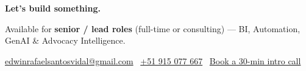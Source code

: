 \documentclass[10pt,letterpaper]{article}
\begin{document}
\noindent\colorbox{chip}{%
  \begin{minipage}{\dimexpr\linewidth-2\fboxsep\relax}
    \vspace{6pt}
    \begin{center}
      {\bfseries\color{ink}Let's build something.}\par
      \vspace{4pt}
      {\small\color{inkdim}Available for \textbf{\color{ink}senior / lead roles} (full-time or consulting) --- BI, Automation, GenAI \& Advocacy Intelligence.}\par
      \vspace{3pt}
      {\small\color{inkdim}\href{mailto:edwinrafaelsantosvidal@gmail.com}{edwinrafaelsantosvidal@gmail.com} \textperiodcentered\ \href{https://wa.me/51915077667}{+51 915 077 667} \textperiodcentered\ \href{https://calendly.com/edwinrafaelsantosvidal/30min}{Book a 30-min intro call}}\par
      \vspace{6pt}
    \end{center}
  \end{minipage}
}
\end{document}

